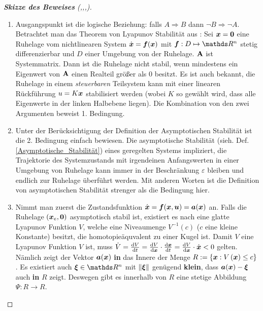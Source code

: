 \begin{proof}[\textbf{Skizze des Beweises} (\cite{brockett1983asymptotic},\cite{liberzon2012switching},\cite{khalil2002nonlinear},\cite{picci2012dynamical})]~\begin{enumerate}
		\item Ausgangspunkt ist die logische Beziehung: falls $A \Rightarrow B$ dann $\neg B \Rightarrow\neg A$. Betrachtet man das Theorem von Lyapunov Stabilität aus \cite{khalil2002nonlinear}: Sei $\boldsymbol x = \boldsymbol 0$ eine Ruhelage vom nichtlinearen System $\dot{\boldsymbol x} = \boldsymbol f(\boldsymbol x)$ mit $\vect{f}: D\mapsto\Reals^{n}$ stetig differenzierbar und $D$ einer Umgebung von der Ruhelage. $\mathbf{A}$ ist Systemmatrix. Dann ist die Ruhelage nicht stabil, wenn mindestens ein Eigenwert von $\mathbf{A}$ einen Realteil größer als $0$ besitzt. Es ist auch bekannt, die Ruhelage in einem \emph{steuerbaren} Teilsystem kann mit einer linearen Rückführung $u = K\boldsymbol x$ stabilisiert werden (wobei $K$ so gewählt wird, dass alle Eigenwerte in der linken Halbebene liegen). Die Kombination von den zwei Argumenten beweist 1. Bedingung. 
		\item Unter der Berücksichtigung der Definition der Asymptotischen Stabilität ist die 2. Bedingung einfach bewiesen. Die asymptotische Stabilität (sieh. Def. \ref{Asymptotische_Stabilität}) eines geregelten Systems impliziert, die Trajektorie des Systemzustands mit irgendeinen Anfangswerten in einer Umgebung von Ruhelage kann immer in der Beschränkung $\varepsilon$ bleiben und endlich zur Ruhelage überführt werden. Mit anderen Worten ist die Definition von asymptotischen Stabilität strenger als die Bedingung hier.
		\item Nimmt man zuerst die Zustandsfunktion $\dot{\boldsymbol x} = \boldsymbol f(\boldsymbol x,\boldsymbol u) = \boldsymbol a(\boldsymbol x)$ an. Falls die Ruhelage $(\boldsymbol x_{e},\boldsymbol 0)$ asymptotisch stabil ist, existiert es nach \cite{wilson1967structure} eine glatte Lyapunov Funktion $V$, welche eine Niveaumenge $V^{-1}(c)$ ($c$ eine kleine Konstante) besitzt, die homotopieäquvalent zu einer Kugel ist. Damit $V$ eine Lyapunov Funktion $V$ ist, muss $\dot{V} = \frac{\mathrm{d} V}{\mathrm{d} t} = \frac{\mathrm{d} V}{\mathrm{d} \boldsymbol x}\cdot \frac{\mathrm{d} \boldsymbol x}{\mathrm{d} t} = \frac{\mathrm{d} V}{\mathrm{d} \boldsymbol x}\cdot \dot{\boldsymbol x}<0$ gelten. Nämlich zeigt der Vektor $\boldsymbol a(\boldsymbol x)$ \textbf{in} das Innere der Menge $R:= \left \{ \boldsymbol x:V\left (\boldsymbol x  \right )\leq c \right \}$. Es existiert auch $\vect{\xi} \in \Reals^{n}$ mit $\left \| \boldsymbol \xi \right \|$ genügend \textbf{klein}, dass $\boldsymbol a(\boldsymbol x)-\boldsymbol \xi$ auch \textbf{in} $R$ zeigt. Deswegen gibt es innerhalb von $R$ eine stetige Abbildung $\Psi:R\to R$.
		

\end{enumerate}
\end{proof}
